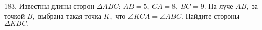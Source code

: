 183. Известны длины сторон $\Delta ABC:\ AB = 5,\ CA = 8,\  BC = 9.$ На луче $AB,$ за точкой $B,$ выбрана такая точка $K,$ что $\angle KCA = \angle ABC.$ Найдите стороны $\Delta KBC.$\\
